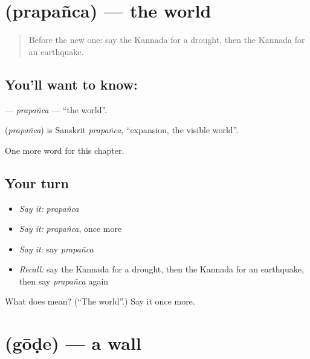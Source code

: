 \section[\texorpdfstring{\kn{ಪ್ರಪಂಚ} (prapañca)}{ಪ್ರಪಂಚ (prapañca)}]{ (prapañca) — the world}

\label{lesson:KA-C287-prapanca}



\begin{quote}
Before the new one: say the Kannada for a drought, then the Kannada for an earthquake.
\end{quote}

\subsection*{You'll want to know: }
\textbf{} — \emph{prapañca} — \textquotedblleft{}the world\textquotedblright{}.

\begin{cousinweb}
\textbf{} (\emph{prapañca}) is Sanskrit \emph{prapañca}, \textquotedblleft{}expansion, the visible world\textquotedblright{}.
\end{cousinweb}

\begin{grammarlens}[title={What you've built}]
One more word for this chapter.
\end{grammarlens}

\subsection*{Your turn}
\begin{itemize}
\raggedright
  \item \emph{Say it:} \emph{prapañca}
  \item \emph{Say it:} \emph{prapañca}, once more
  \item \emph{Say it:} say \emph{prapañca}
  \item \emph{Recall:} say the Kannada for a drought, then the Kannada for an earthquake, then say \emph{prapañca} again
\end{itemize}

\begin{tcolorbox}[breakable,colback=teal!4,colframe=teal!35!black,title={Before you move on}]
What does  mean? (\textquotedblleft{}The world\textquotedblright{}.) Say it once more.
\end{tcolorbox}
\section[\texorpdfstring{\kn{ಗೋಡೆ} (gōḍe)}{ಗೋಡೆ (gōḍe)}]{ (gōḍe) — a wall}

